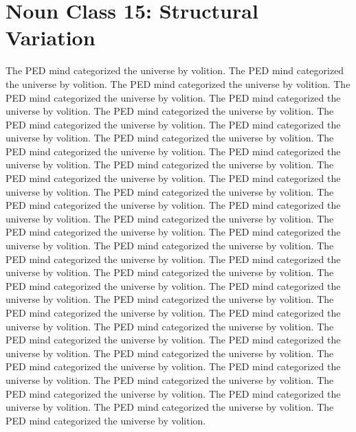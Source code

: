\section{Noun Class 15: Structural Variation}
The PED mind categorized the universe by volition. The PED mind categorized the universe by volition. The PED mind categorized the universe by volition. The PED mind categorized the universe by volition. The PED mind categorized the universe by volition. The PED mind categorized the universe by volition. The PED mind categorized the universe by volition. The PED mind categorized the universe by volition. The PED mind categorized the universe by volition. The PED mind categorized the universe by volition. The PED mind categorized the universe by volition. The PED mind categorized the universe by volition. The PED mind categorized the universe by volition. The PED mind categorized the universe by volition. The PED mind categorized the universe by volition. The PED mind categorized the universe by volition. The PED mind categorized the universe by volition. The PED mind categorized the universe by volition. The PED mind categorized the universe by volition. The PED mind categorized the universe by volition. The PED mind categorized the universe by volition. The PED mind categorized the universe by volition. The PED mind categorized the universe by volition. The PED mind categorized the universe by volition. The PED mind categorized the universe by volition. The PED mind categorized the universe by volition. The PED mind categorized the universe by volition. The PED mind categorized the universe by volition. The PED mind categorized the universe by volition. The PED mind categorized the universe by volition. The PED mind categorized the universe by volition. The PED mind categorized the universe by volition. The PED mind categorized the universe by volition. The PED mind categorized the universe by volition. The PED mind categorized the universe by volition. The PED mind categorized the universe by volition. The PED mind categorized the universe by volition. The PED mind categorized the universe by volition. The PED mind categorized the universe by volition. The PED mind categorized the universe by volition. 

